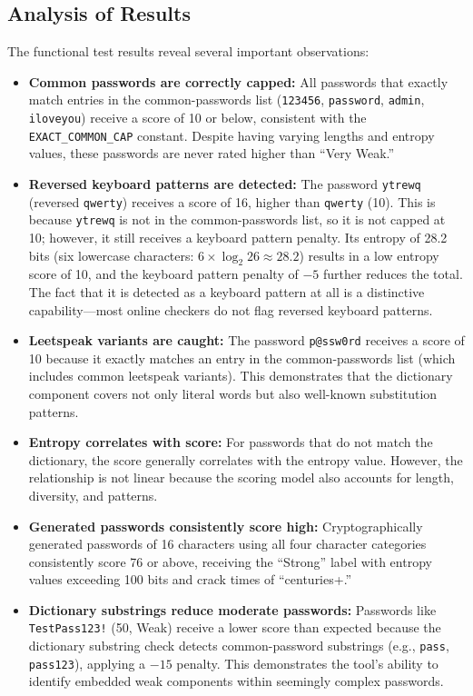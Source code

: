 \subsection{Analysis of Results}

The functional test results reveal several important observations:

\begin{itemize}
    \item \textbf{Common passwords are correctly capped:} All passwords that exactly match entries in the common-passwords list (\texttt{123456}, \texttt{password}, \texttt{admin}, \texttt{iloveyou}) receive a score of 10 or below, consistent with the \texttt{EXACT\_COMMON\_CAP} constant. Despite having varying lengths and entropy values, these passwords are never rated higher than ``Very Weak.''

    \item \textbf{Reversed keyboard patterns are detected:} The password \texttt{ytrewq} (reversed \texttt{qwerty}) receives a score of 16, higher than \texttt{qwerty} (10). This is because \texttt{ytrewq} is not in the common-passwords list, so it is not capped at 10; however, it still receives a keyboard pattern penalty. Its entropy of 28.2 bits (six lowercase characters: $6 \times \log_2 26 \approx 28.2$) results in a low entropy score of 10, and the keyboard pattern penalty of $-5$ further reduces the total. The fact that it is detected as a keyboard pattern at all is a distinctive capability---most online checkers do not flag reversed keyboard patterns.

    \item \textbf{Leetspeak variants are caught:} The password \texttt{p@ssw0rd} receives a score of 10 because it exactly matches an entry in the common-passwords list (which includes common leetspeak variants). This demonstrates that the dictionary component covers not only literal words but also well-known substitution patterns.

    \item \textbf{Entropy correlates with score:} For passwords that do not match the dictionary, the score generally correlates with the entropy value. However, the relationship is not linear because the scoring model also accounts for length, diversity, and patterns.

    \item \textbf{Generated passwords consistently score high:} Cryptographically generated passwords of 16 characters using all four character categories consistently score 76 or above, receiving the ``Strong'' label with entropy values exceeding 100 bits and crack times of ``centuries+.''

    \item \textbf{Dictionary substrings reduce moderate passwords:} Passwords like \texttt{TestPass123!} (50, Weak) receive a lower score than expected because the dictionary substring check detects common-password substrings (e.g., \texttt{pass}, \texttt{pass123}), applying a $-15$ penalty. This demonstrates the tool's ability to identify embedded weak components within seemingly complex passwords.
\end{itemize}



